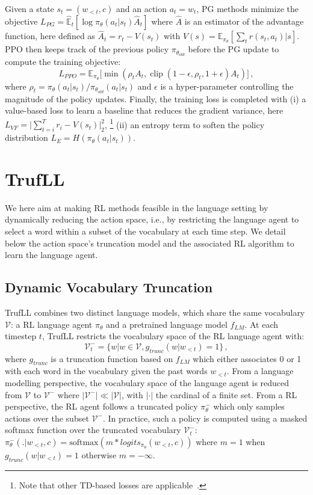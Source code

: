 \documentclass{article}
\newcommand{\Voc}{\mathcal{V}}
\newcommand{\TVoc}{\mathcal{V}^{-}}
\newcommand{\params}{\theta}
\newcommand{\policy}{\pi_{\params}}
\newcommand{\policyold}{\pi_{\params_{old}}}
\newcommand{\algo}{TrufLL\xspace}
\DeclareMathOperator{\clip}{clip}
\begin{document}
Given a state $s_t=(w_{<t}, c)$ and an action $a_t=w_t$, PG methods minimize the objective $L_{PG} =\mathbb{\widehat{E}}_{t}[\log \policy(a_t|s_t) \hat{A}_t]$ where $\hat{A}$ is an estimator of the advantage function, here defined as $\hat{A}_t= r_t - V(s_t)$ with $V(s)=\mathbb{E}_{\policy}[\sum_t r(s_t, a_t)|s]$. PPO then keeps track of the previous policy $\policyold$ before the PG update to compute the training objective:
\begin{equation*}
    L_{PPO} = \mathbb{E}_{\policy}\big[\min (\rho_t A_t, \clip(1-\epsilon, \rho_t, 1 + \epsilon)A_t)\big]\,,
\end{equation*}  
where $\rho_t=\policy(a_t|s_t)/\policyold(a_t| s_t)$ and $\epsilon$ is a hyper-parameter controlling the magnitude of the policy updates. Finally, the training loss is completed with (i) a value-based loss to learn a baseline that reduces the gradient variance, here $L_{VF} = \vert \sum_{t=i}^{T} r_i - V(s_t) \vert^{2}_{2}$,
\footnote{Note that other TD-based losses are applicable~\citep{sutton1998introduction,schulman2015high,espeholt2018impala}.}
(ii) an entropy term to soften the policy distribution $L_{E} = H(\policy(a_t|s_t))$.


\section{\algo}
\label{sec:truncation:model}

We here aim at making RL methods feasible in the language setting by dynamically reducing the action space, i.e., by restricting the language agent to select a word within a subset of the vocabulary at each time step. We detail below the action space's truncation model and the associated RL algorithm to learn the language agent. 

\subsection{Dynamic Vocabulary Truncation}
\label{subsec:trufll:truncation}
\algo combines two distinct language models, which share the same vocabulary $\Voc$: a RL language agent $\policy$ and a pretrained language model $f_{LM}$. 
At each timestep $t$, \algo restricts the vocabulary space of the RL language agent with: 
\vspace{-0.3em}
\begin{equation*}
  \TVoc_t = \{ w | w \in \Voc, g_{trunc}(w|w_{<t}) =1 \}\,,
\end{equation*}
where $g_{trunc}$ is a truncation function based on $f_{LM}$ which either associates 0 or 1 with each word in the vocabulary given the past words $w_{<t}$. From a language modelling perspective, the vocabulary space of the language agent is reduced from $\Voc$ to $\TVoc$ where $|\TVoc| \ll |\Voc|$, with $|\cdot|$ the cardinal of a finite set. From a RL perspective, the RL agent follows a truncated policy $\policy^{-}$ which only samples actions over the subset $\TVoc$. In practice,  
such a policy is computed using a masked softmax function over the truncated vocabulary $\TVoc_t$:
$\policy^{-}(.|w_{<t}, c)=\mathrm{softmax}(m*logits_{\policy}(w_{<t}, c))$ where $m=1$ when $g_{trunc}(w|w_{<t})=1$ otherwise $m=-\infty$. 
\end{document}
